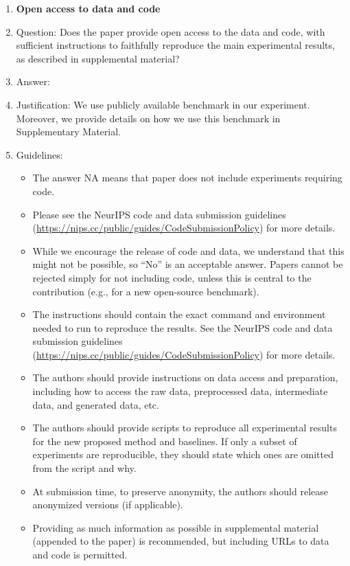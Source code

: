 \documentclass{article}
\begin{document}
\begin{enumerate}
\item {\bf Open access to data and code}
    \item[] Question: Does the paper provide open access to the data and code, with sufficient instructions to faithfully reproduce the main experimental results, as described in supplemental material?
    \item[] Answer: \answerYes{} %
    \item[] Justification: We use publicly available benchmark in our experiment. Moreover, we provide details on how we use this benchmark in Supplementary Material.
    \item[] Guidelines:
    \begin{itemize}
        \item The answer NA means that paper does not include experiments requiring code.
        \item Please see the NeurIPS code and data submission guidelines (\url{https://nips.cc/public/guides/CodeSubmissionPolicy}) for more details.
        \item While we encourage the release of code and data, we understand that this might not be possible, so “No” is an acceptable answer. Papers cannot be rejected simply for not including code, unless this is central to the contribution (e.g., for a new open-source benchmark).
        \item The instructions should contain the exact command and environment needed to run to reproduce the results. See the NeurIPS code and data submission guidelines (\url{https://nips.cc/public/guides/CodeSubmissionPolicy}) for more details.
        \item The authors should provide instructions on data access and preparation, including how to access the raw data, preprocessed data, intermediate data, and generated data, etc.
        \item The authors should provide scripts to reproduce all experimental results for the new proposed method and baselines. If only a subset of experiments are reproducible, they should state which ones are omitted from the script and why.
        \item At submission time, to preserve anonymity, the authors should release anonymized versions (if applicable).
        \item Providing as much information as possible in supplemental material (appended to the paper) is recommended, but including URLs to data and code is permitted.
    \end{itemize}



\end{enumerate}
\end{document}
